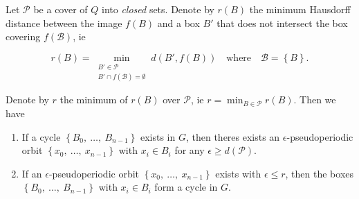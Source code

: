 \begin{proposition}
    \cite*{chain,dynbook}
    Let $\mathcal{P}$ be a cover of $Q$ into \emph{closed} sets. 
    Denote by $r(B)$ the minimum Hausdorff distance between the image $f(B)$ and a 
    box $B'$ that does not intersect the box covering $f(\mathcal{B})$, ie 
    
    \begin{equation}
        r(B) = \min_{\substack{B' \in \mathcal{P}\ \\ B' \cap f(\mathcal{B}) = \emptyset}} d(B', f(B)) 
        \quad \text{where} \quad \mathcal{B} = \left\{ B \right\}.
    \end{equation}
    
    Denote by $r$ the minimum of $r(B)$ over $\mathcal{P}$, ie 
    $r = \min_{B \in \mathcal{P}} r(B)$. Then we have

    \begin{enumerate}
        \item If a cycle $\left\{ B_0,\ \ldots,\ B_{n-1} \right\}$ exists in $G$, then 
        theres exists an $\epsilon$-pseudoperiodic orbit 
        $\left\{ x_0,\ \ldots,\ x_{n-1} \right\}$ with $x_i \in B_i$ for any 
        $\epsilon \geq d(\mathcal{P})$. 
        \item If an $\epsilon$-pseudoperiodic orbit 
        $\left\{ x_0,\ \ldots,\ x_{n-1} \right\}$ exists with $\epsilon \leq r$, then the 
        boxes $\left\{ B_0,\ \ldots,\ B_{n-1} \right\}$ with $x_i \in B_i$ form a cycle in 
        $G$. 
    \end{enumerate}

\end{proposition}

